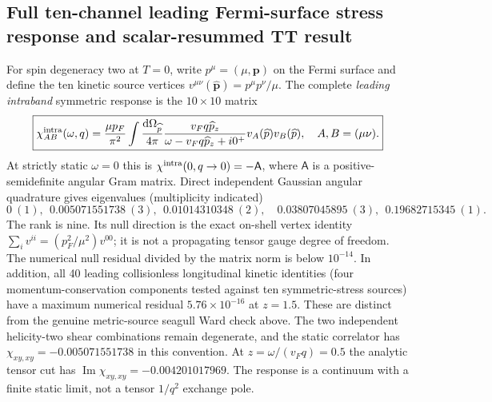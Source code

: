 \documentclass[11pt,a4paper]{article}
\begin{document}
\subsection{Full ten-channel leading Fermi-surface stress response and scalar-resummed TT result}
For spin degeneracy two at $T=0$, write $p^\mu=(\mu,\bm p)$ on the Fermi surface and define the ten kinetic source vertices $v^{\mu\nu}(\widehat{\bm p})=p^\mu p^\nu/\mu$. The complete \emph{leading intraband} symmetric response is the $10\times10$ matrix
\begin{equation}\label{eq:qm007-matrix}
 \boxed{\chi^{\rm intra}_{AB}(\omega,q)
 =\frac{\mu p_F}{\pi^2}\int\frac{\mathrm d\Omega_{\widehat p}}{4\pi}
 \frac{v_F q\widehat p_z}{\omega-v_Fq\widehat p_z+i0^+}
 v_A(\widehat p)v_B(\widehat p),\quad A,B=(\mu\nu).}
\end{equation}
At strictly static $\omega=0$ this is $\chi^{\rm intra}(0,q\to0)=-\mathsf A$, where $\mathsf A$ is a positive-semidefinite angular Gram matrix. Direct independent Gaussian angular quadrature gives eigenvalues (multiplicity indicated)
\begin{equation}\label{eq:qm007-eigs}
\boxed{0\ (1),\ \ 0.005071551738\ (3),\ \ 0.01014310348\ (2),\quad
0.03807045895\ (3),\ \ 0.19682715345\ (1).}
\end{equation}
The rank is nine. Its null direction is the exact on-shell vertex identity
$\sum_i v^{ii}=(p_F^2/\mu^2)v^{00}$; it is not a propagating tensor gauge degree of freedom. The numerical null residual divided by the matrix norm is below $10^{-14}$. In addition, all 40 leading collisionless longitudinal kinetic identities (four momentum-conservation components tested against ten symmetric-stress sources) have a maximum numerical residual $5.76\times10^{-16}$ at $z=1.5$. These are distinct from the genuine metric-source seagull Ward check above. The two independent helicity-two shear combinations remain degenerate, and the static correlator has $\chi_{xy,xy}=-0.005071551738$ in this convention. At $z=\omega/(v_Fq)=0.5$ the analytic tensor cut has $\operatorname{Im}\chi_{xy,xy}=-0.004201017969$. The response is a continuum with a finite static limit, not a tensor $1/q^2$ exchange pole.
\end{document}
